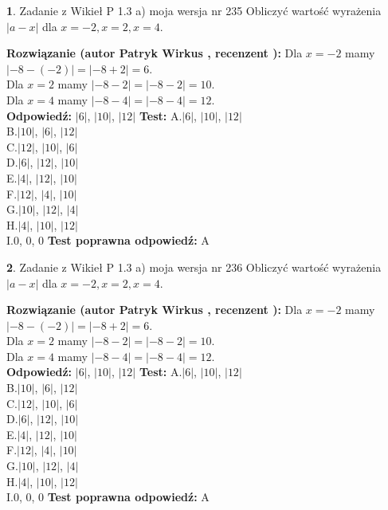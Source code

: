 \documentclass[12pt, a4paper]{article}
\theoremstyle{definition} %
\newtheorem{zad}{}
\newcommand{\zadStart}[1]{\begin{zad}#1\newline}
\newcommand{\zadStop}{\end{zad}}
\newcommand{\rozwStart}[2]{\noindent \textbf{Rozwiązanie (autor #1 , recenzent #2): }\newline}
\newcommand{\rozwStop}{\newline}
\newcommand{\odpStart}{\noindent \textbf{Odpowiedź:}\newline}
\newcommand{\odpStop}{\newline}
\newcommand{\testStart}{\noindent \textbf{Test:}\newline}
\newcommand{\testStop}{\newline}
\newcommand{\kluczStart}{\noindent \textbf{Test poprawna odpowiedź:}\newline}
\newcommand{\kluczStop}{\newline}
\begin{document}
\zadStart{Zadanie z Wikieł P 1.3 a) moja wersja nr 235}
Obliczyć wartość wyrażenia $|a - x|$ dla $x=-2,x=2,x=4$.
\zadStop
\rozwStart{Patryk Wirkus}{}
Dla $x = -2$ mamy $|-8 - (-2)| = |-8 + 2| = 6$.\\
Dla $x = 2$ mamy $|-8 - 2| = |-8 - 2| = 10$.\\
Dla $x = 4$ mamy $|-8 - 4| = |-8 - 4| = 12$.\\
\rozwStop
\odpStart
$|6|$, $|10|$, $|12|$
\odpStop
\testStart
A.$|6|$, $|10|$, $|12|$\\
B.$|10|$, $|6|$, $|12|$\\
C.$|12|$, $|10|$, $|6|$\\
D.$|6|$, $|12|$, $|10|$\\
E.$|4|$, $|12|$, $|10|$\\
F.$|12|$, $|4|$, $|10|$\\
G.$|10|$, $|12|$, $|4|$\\
H.$|4|$, $|10|$, $|12|$\\
I.$0$, $0$, $0$
\testStop
\kluczStart
A
\kluczStop



\zadStart{Zadanie z Wikieł P 1.3 a) moja wersja nr 236}
Obliczyć wartość wyrażenia $|a - x|$ dla $x=-2,x=2,x=4$.
\zadStop
\rozwStart{Patryk Wirkus}{}
Dla $x = -2$ mamy $|-8 - (-2)| = |-8 + 2| = 6$.\\
Dla $x = 2$ mamy $|-8 - 2| = |-8 - 2| = 10$.\\
Dla $x = 4$ mamy $|-8 - 4| = |-8 - 4| = 12$.\\
\rozwStop
\odpStart
$|6|$, $|10|$, $|12|$
\odpStop
\testStart
A.$|6|$, $|10|$, $|12|$\\
B.$|10|$, $|6|$, $|12|$\\
C.$|12|$, $|10|$, $|6|$\\
D.$|6|$, $|12|$, $|10|$\\
E.$|4|$, $|12|$, $|10|$\\
F.$|12|$, $|4|$, $|10|$\\
G.$|10|$, $|12|$, $|4|$\\
H.$|4|$, $|10|$, $|12|$\\
I.$0$, $0$, $0$
\testStop
\kluczStart
A
\kluczStop
\end{document}
